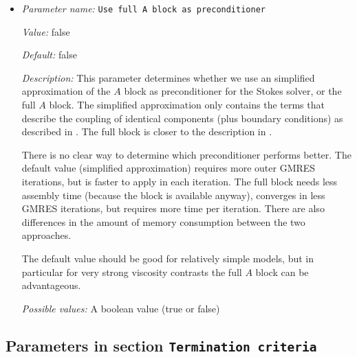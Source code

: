 \begin{itemize}
{\it Default:} false


{\it Description:} If set to true the linear system for the Stokes equation will be solved using Trilinos klu, otherwise an iterative Schur complement solver is used. The direct solver is only efficient for small problems.


{\it Possible values:} A boolean value (true or false)
\item {\it Parameter name:} {\tt Use full A block as preconditioner}
\label{parameters:Solver parameters/Stokes solver parameters/Use full A block as preconditioner}


{\it Value:} false


{\it Default:} false


{\it Description:} This parameter determines whether we use an simplified approximation of the $A$ block as preconditioner for the Stokes solver, or the full $A$ block. The simplified approximation only contains the terms that describe the coupling of identical components (plus boundary conditions) as described in \cite{KHB12}. The full block is closer to the description in \cite{rudi2017weighted}.

There is no clear way to determine which preconditioner performs better. The default value (simplified approximation) requires more outer GMRES iterations, but is faster to apply in each iteration. The full block needs less assembly time (because the block is available anyway), converges in less GMRES iterations, but requires more time per iteration. There are also differences in the amount of memory consumption between the two approaches.

The default value should be good for relatively simple models, but in particular for very strong viscosity contrasts the full $A$ block can be advantageous.


{\it Possible values:} A boolean value (true or false)
\end{itemize}

\subsection{Parameters in section \tt Termination criteria}
\label{parameters:Termination_20criteria}

